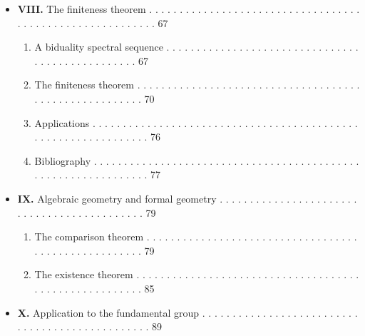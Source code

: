 \documentclass[
  11pt,
  a4paper,
]{book}
\providecommand{\tightlist}{%
  \setlength{\itemsep}{0pt}\setlength{\parskip}{0pt}}
\begin{document}
\begin{itemize}
  \begin{enumerate}
  \def\labelenumi{\arabic{enumi}.}
  \tightlist
  \item
    Study for \(i < n\) . . . . . . . . . . . . . . . . . . . . . . . .
    . . . . . . . . . . . . . . . . . . . . . . . . . . . . . . . . . .
    . . 61
  \item
    Study for \(i > n\) . . . . . . . . . . . . . . . . . . . . . . . .
    . . . . . . . . . . . . . . . . . . . . . . . . . . . . . . . . . .
    . . 64
  \end{enumerate}
\item
  \textbf{VIII.} The finiteness theorem . . . . . . . . . . . . . . . .
  . . . . . . . . . . . . . . . . . . . . . . . . . . . . . . . . . . .
  . . . . . . . 67

  \begin{enumerate}
  \def\labelenumi{\arabic{enumi}.}
  \tightlist
  \item
    A biduality spectral sequence . . . . . . . . . . . . . . . . . . .
    . . . . . . . . . . . . . . . . . . . . . . . . . . . . . . 67
  \item
    The finiteness theorem . . . . . . . . . . . . . . . . . . . . . . .
    . . . . . . . . . . . . . . . . . . . . . . . . . . . . . . . . 70
  \item
    Applications . . . . . . . . . . . . . . . . . . . . . . . . . . . .
    . . . . . . . . . . . . . . . . . . . . . . . . . . . . . . . . . .
    . 76
  \item
    Bibliography . . . . . . . . . . . . . . . . . . . . . . . . . . . .
    . . . . . . . . . . . . . . . . . . . . . . . . . . . . . . . . . .
    . 77
  \end{enumerate}
\item
  \textbf{IX.} Algebraic geometry and formal geometry . . . . . . . . .
  . . . . . . . . . . . . . . . . . . . . . . . . . . . . . . . . . . .
  79

  \begin{enumerate}
  \def\labelenumi{\arabic{enumi}.}
  \tightlist
  \item
    The comparison theorem . . . . . . . . . . . . . . . . . . . . . . .
    . . . . . . . . . . . . . . . . . . . . . . . . . . . . . . 79
  \item
    The existence theorem . . . . . . . . . . . . . . . . . . . . . . .
    . . . . . . . . . . . . . . . . . . . . . . . . . . . . . . . . 85
  \end{enumerate}
\item
  \textbf{X.} Application to the fundamental group . . . . . . . . . . .
  . . . . . . . . . . . . . . . . . . . . . . . . . . . . . . . . . . .
  . . 89


\end{itemize}
\end{document}
